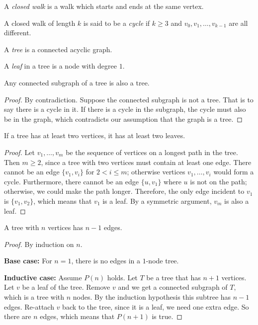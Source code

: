 \documentclass[11pt]{article}
\begin{document}
\begin{definition}
A \emph{closed walk} is a walk which starts and ends at the same vertex.
\end{definition}

\begin{definition}
A closed walk of length $k$ is said to be a \emph{cycle} if $k \geq 3$ and $v_0,v_1,\dots,v_{k-1}$
are all different.
\end{definition}

\begin{definition}
A \emph{tree} is a connected acyclic graph.
\end{definition}

\begin{definition}
A \emph{leaf} in a tree is a node with degree $1$.
\end{definition}

\begin{lemma}
Any connected subgraph of a tree is also a tree.
\end{lemma}

\begin{proof}
By contradiction. Suppose the connected subgraph is not a tree. That is to say there is a cycle in
it. If there is a cycle in the subgraph, the cycle must also be in the graph, which contradicts our
assumption that the graph is a tree.
\end{proof}

\begin{theorem}
If a tree has at least two vertices, it has at least two leaves.
\end{theorem}

\begin{proof}
Let $v_1,\dots,v_m$ be the sequence of vertices on a longest path in the tree. Then $m \geq 2$, since a
tree with two vertices must contain at least one edge. There cannot be an edge $\{v_1,v_i\}$ for
$2 < i \leq m$; otherwise vertices $v_1,\dots,v_i$ would form a cycle. Furthermore, there cannot be an
edge $\{u,v_1\}$ where $u$ is not on the path; otherwise, we could make the path longer. Therefore, the
only edge incident to $v_1$ is $\{v_1,v_2\}$, which means that $v_1$ is a leaf. By a symmetric argument,
$v_m$ is also a leaf.
\end{proof}

\begin{lemma}
A tree with $n$ vertices has $n-1$ edges.
\end{lemma}

\begin{proof}
By induction on $n$.

\textbf{Base case:} For $n=1$, there is no edges in a $1$-node tree.

\textbf{Inductive case:} Assume $P(n)$ holds. Let $T$ be a tree that has $n+1$ vertices. Let $v$ be a
leaf of the tree. Remove $v$ and we get a connected subgraph of $T$, which is a tree with $n$ nodes.
By the induction hypothesis this subtree has $n-1$ edges. Re-attach $v$ back to the tree, since it is
a leaf, we need one extra edge. So there are $n$ edges, which means that $P(n+1)$ is true.
\end{proof}
\end{document}
